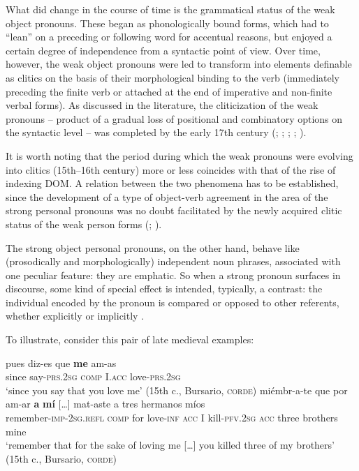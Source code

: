 \documentclass[output=paper]{LSP/langsci}
\begin{document}
 What did change in the course of time is the grammatical status of the weak object pronouns. These began as phonologically bound forms, which had to “lean” on a preceding or following word for accentual reasons, but enjoyed a certain degree of independence from a syntactic point of view. Over time, however, the weak object pronouns were led to transform into elements definable as clitics on the basis of their morphological binding to the verb (immediately preceding the finite verb or attached at the end of imperative and non-finite verbal forms). As discussed in the literature, the cliticization of the weak pronouns – product of a gradual loss of positional and combinatory options on the syntactic level – was completed by the early 17th century (\citealt{Rivero1986Parameters}; \citealt{Rini1990Dating}; \citealt{Fontana1993Phrase}; \citealt{FernandezSoriano1999Pronombre}; \citealt{Nieuwenhuijsen2006Cambios}).

 It is worth noting that the period during which the weak pronouns were evolving into clitics (15th–16th century) more or less coincides with that of the rise of indexing DOM. A relation between the two phenomena has to be established, since the development of a type of object-verb agreement in the area of the strong personal pronouns was no doubt facilitated by the newly acquired clitic status of the weak person forms (\citealt{Rini1990Dating}; \citealt{Enrique-Arias2003Clitics}).

 The strong object personal pronouns, on the other hand, behave like (prosodically and morphologically) independent noun phrases, associated with one peculiar feature: they are emphatic. So when a strong pronoun surfaces in discourse, some kind of special effect is intended, typically, a contrast: the individual encoded by the pronoun is compared or opposed to other referents, whether explicitly or implicitly \citep{Lujan1999Expresion}. 

 To illustrate, consider this pair of late medieval examples:

\begin{exe}
\ex%
\label{04-me-ex:3}
\begin{xlist}
\ex%
\label{04-me-ex:3a}
\gll pues diz-es que \textbf{me} am-as\\
 since say-\textsc{prs.2sg} \textsc{comp} I.\textsc{acc} love-\textsc{prs.2sg}\\
\glt ‘since you say that you love me’ (15th c., Bursario, \textsc{corde})
\ex%
\label{04-me-ex:3b}
\gll miémbr-a-te que por am-ar \textbf{a} \textbf{mí} […] mat-aste a tres hermanos míos\\
remember-\textsc{imp-2sg.refl} \textsc{comp} for love-\textsc{inf} \textsc{acc} I { } kill-\textsc{pfv.2sg} \textsc{acc} three brothers mine\\
\glt ‘remember that for the sake of loving me […] you killed three of my brothers’ (15th c., Bursario, \textsc{corde})
\end{xlist}
\end{exe}
\end{document}
